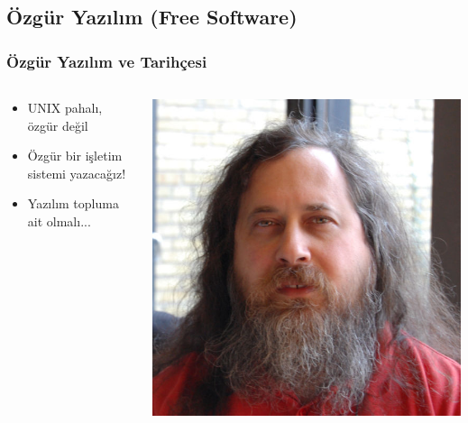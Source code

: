 \documentclass{beamer}
\begin{document}
	\subsection{Özgür Yazılım (Free Software)}
		\begin{frame}
			\frametitle{Özgür Yazılım ve Tarihçesi}
			\begin{columns}
			\begin{column}[l]{5cm}
				\begin{itemize}
				\item UNIX pahalı, özgür değil
				\item Özgür bir işletim sistemi yazacağız!
				\item Yazılım topluma ait olmalı...
				\end{itemize}
			\end{column}
			\begin{column}[r]{5cm}
			\includegraphics{img/richard}
			\end{column}
			\end{columns}
			
		\end{frame}
		
\end{document}
